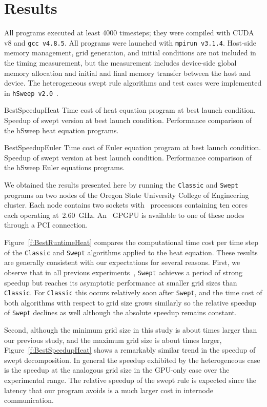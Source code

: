 \section{Results} \label{sec:hResults}

All programs executed at least \num{4000} timesteps; they were compiled with CUDA v8 and \texttt{gcc v4.8.5}.
All programs were launched with \texttt{mpirun v3.1.4}.
Host-side memory management, grid generation, and initial conditions are not included in the timing measurement, but the measurement includes device-side global memory allocation and initial and final memory transfer between the host and device.
The heterogeneous swept rule algorithms and test cases were implemented in \texttt{hSweep v2.0}~\cite{hSweepz}.

{BestSpeedupHeat}
{Time cost of heat equation program at best launch condition.}
{Speedup of swept version at best launch condition.}
{Performance comparison of the hSweep heat equation programs.}

{BestSpeedupEuler}
{Time cost of Euler equation program at best launch condition.}
{Speedup of swept version at best launch condition.}
{Performance comparison of the hSweep Euler equations programs.}

We obtained the results presented here by running the \texttt{Classic} and \texttt{Swept}
programs on two nodes of the Oregon State University College of Engineering cluster.
Each node contains two sockets with~\CCPU{} processors containing ten cores each operating at~\SI{2.60}{\giga\hertz}.
An~\CGPU{} GPGPU is available to one of these nodes through a PCI connection.

Figure~\ref{f:BestRuntimeHeat} compares the computational time cost per time step
of the \texttt{Classic} and \texttt{Swept} algorithms applied to the heat equation.
These results are generally consistent with our expectations for several reasons.
First, we observe that in all previous experiments~\cite{OurJCP, alhubail:16jcp},
\texttt{Swept} achieves a period of strong speedup but reaches its asymptotic performance
at smaller grid sizes than \texttt{Classic}.
For \texttt{Classic} this occurs relatively soon after \texttt{Swept}, and the time cost of both algorithms with respect to grid size grows similarly so the relative speedup of \texttt{Swept} declines as well although the absolute speedup remains constant.

Second, although the minimum grid size in this study is about  times larger
than our previous study, and the maximum grid size is about  times larger,
Figure~\ref{f:BestSpeedupHeat} shows a remarkably similar trend in the speedup of swept decomposition.
In general the speedup exhibited by the heterogeneous case is  the speedup at the analogous grid size in the GPU-only case over the experimental range.
The relative speedup of the swept rule is expected since the latency that our program avoids is a much larger cost in internode communication.

